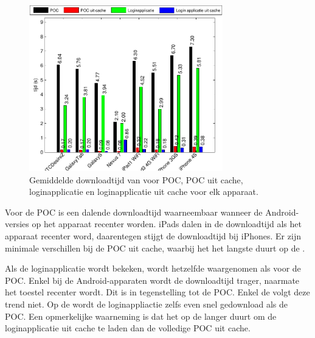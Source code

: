 \begin{figure}
  \centering
  \includegraphics[width=0.75\textwidth]{figuren/performance-jquery.pdf}
  \caption{Gemiddelde downloadtijd van \jqm{} voor POC,  POC uit cache, loginapplicatie en loginapplicatie uit cache voor elk apparaat.}
  \label{fig:performantie-jqm}
\end{figure}

Voor de POC is een dalende downloadtijd waarneembaar wanneer de Android-versies op het apparaat recenter worden.
iPads dalen in de downloadtijd als het apparaat recenter word, daarentegen stijgt de downloadtijd bij iPhones.
Er zijn minimale verschillen bij de POC uit cache, waarbij het het langste duurt op de \iphoneiv{}.

Als de loginapplicatie wordt bekeken, wordt hetzelfde waargenomen als voor de POC.
Enkel bij de Android-apparaten wordt de downloadtijd trager, naarmate het toestel recenter wordt. 
Dit is in tegenstelling tot de POC.
Enkel de \nexus{} volgt deze trend niet.
Op de \nexus{} wordt de loginappliactie zelfs even snel gedownload als de POC.
Een opmerkelijke waarneming is dat het op de \nexus{} langer duurt om de loginapplicatie uit cache te laden dan de volledige POC uit cache.


\section{\lungo}
\label{app:performantie-lungo}

